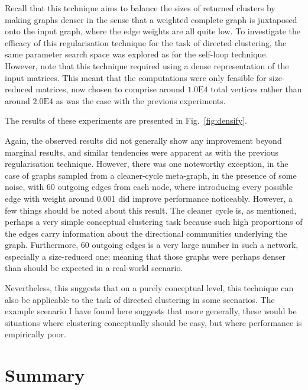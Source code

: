 Recall that this technique aims to balance the sizes of returned clusters by making graphs denser 
in the sense that a weighted complete graph is juxtaposed onto the input graph, where the edge 
weights are all quite low.  To investigate the efficacy of this regularisation technique for the 
task of directed clustering, the same parameter search space was explored as for the self-loop 
technique. However, note that this technique required using a dense representation of the input 
matrices. This meant that the computations were only feasible for size-reduced matrices, now 
chosen to comprise around $1.0\scriptstyle{\mathrm E}4$ total vertices rather than around 
$2.0\scriptstyle{\mathrm E}4$ as was the case with the previous experiments.

The results of these experiments are presented in Fig.\ \ref{fig:densify}.

 

Again, the observed results did not generally show any improvement beyond marginal results, and 
similar tendencies were apparent as with the previous regularisation technique. However, there was 
one noteworthy exception, in the case of graphs sampled from a cleaner-cycle meta-graph, in the 
presence of some noise, with 60 outgoing edges from each node, where introducing every possible 
edge with weight around 0.001 did improve performance noticeably. However, a few things should be 
noted about this result. The cleaner cycle is, as mentioned, perhaps a very simple conceptual 
clustering task because such high proportions of the edges carry information about the directional 
communities underlying the graph. Furthermore, 60 outgoing edges is a very large number in such a 
network, especially a size-reduced one; meaning that those graphs were perhaps denser than should 
be expected in a real-world scenario.

 

Nevertheless, this suggests that on a purely conceptual level, this technique can also be 
applicable to the task of directed clustering in some scenarios. The example scenario I have found 
here suggests that more generally, these would be situations where clustering conceptually should 
be easy, but where performance is empirically poor.

 

\section{Summary}


